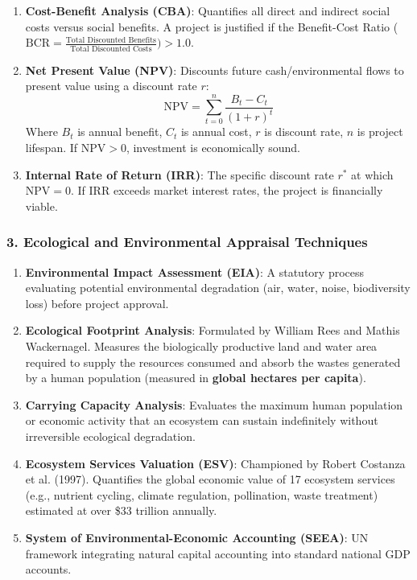 \documentclass[11pt,a4paper]{article}
\begin{document}
\begin{enumerate}[leftmargin=*]
  \item \textbf{Cost-Benefit Analysis (CBA)}: Quantifies all direct and indirect social costs versus social benefits. A project is justified if the Benefit-Cost Ratio ($\text{BCR} = \frac{\text{Total Discounted Benefits}}{\text{Total Discounted Costs}}) > 1.0$.
  
  \item \textbf{Net Present Value (NPV)}: Discounts future cash/environmental flows to present value using a discount rate $r$:
  \begin{equation}
    \text{NPV} = \sum_{t=0}^{n} \frac{B_t - C_t}{(1 + r)^t}
  \end{equation}
  Where $B_t$ is annual benefit, $C_t$ is annual cost, $r$ is discount rate, $n$ is project lifespan. If $\text{NPV} > 0$, investment is economically sound.

  \item \textbf{Internal Rate of Return (IRR)}: The specific discount rate $r^*$ at which $\text{NPV} = 0$. If IRR exceeds market interest rates, the project is financially viable.
\end{enumerate}

\subsubsection{3. Ecological and Environmental Appraisal Techniques}
\begin{enumerate}[leftmargin=*]
  \item \textbf{Environmental Impact Assessment (EIA)}: A statutory process evaluating potential environmental degradation (air, water, noise, biodiversity loss) before project approval.
  \item \textbf{Ecological Footprint Analysis}: Formulated by William Rees and Mathis Wackernagel. Measures the biologically productive land and water area required to supply the resources consumed and absorb the wastes generated by a human population (measured in \textbf{global hectares per capita}).
  \item \textbf{Carrying Capacity Analysis}: Evaluates the maximum human population or economic activity that an ecosystem can sustain indefinitely without irreversible ecological degradation.
  \item \textbf{Ecosystem Services Valuation (ESV)}: Championed by Robert Costanza et al. (1997). Quantifies the global economic value of 17 ecosystem services (e.g., nutrient cycling, climate regulation, pollination, waste treatment) estimated at over \$33 trillion annually.
  \item \textbf{System of Environmental-Economic Accounting (SEEA)}: UN framework integrating natural capital accounting into standard national GDP accounts.
\end{enumerate}
\end{document}
